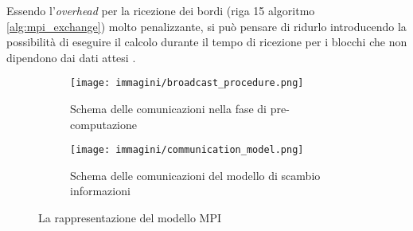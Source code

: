 Essendo l'\textit{overhead} per la ricezione dei bordi (riga 15 algoritmo \ref{alg:mpi_exchange}) molto penalizzante, si può pensare di ridurlo introducendo la possibilità di eseguire il calcolo durante il tempo di ricezione per i blocchi che non dipendono dai dati attesi .
\begin{figure}[H]
\begin{subfigure}{0.5\textwidth}
	\centering
    \texttt{[image: immagini/broadcast\_procedure.png]}
    \caption{Schema delle comunicazioni nella fase di pre-computazione}
	\label{fig:pre_proc_mpi}
\end{subfigure}%
\begin{subfigure}{0.5\textwidth}
	\centering
	\texttt{[image: immagini/communication\_model.png]}
	\caption{Schema delle comunicazioni del modello di scambio informazioni}
	\label{fig:my_mpi_model}
\end{subfigure}
\caption{La rappresentazione del modello MPI}
\end{figure}